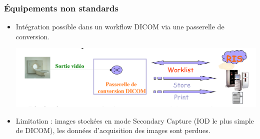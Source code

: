 \frame
{
	\frametitle{\'Equipements non standards}
	
	\begin{itemize}
		\item Int\'egration possible dans un workflow DICOM via une passerelle de conversion.
		
		\begin{center}
			\includegraphics[width=\linewidth]{./figures/passerelle.png}
		\end{center}
		\item Limitation : images stock\'ees en mode Secondary Capture (IOD le plus simple de DICOM), les donn\'ees d'acquisition des images sont perdues.
	\end{itemize}
}

